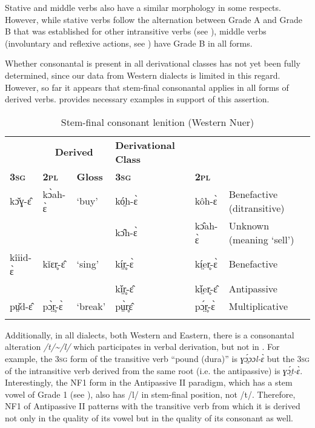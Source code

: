 \documentclass[output=paper,newtxmath,modfonts,nonflat,draftmode]{langsci/langscibook}
\begin{document}
Stative and middle verbs also have a similar morphology in some respects. However, while stative verbs follow the alternation between Grade A and Grade B that was established for other intransitive verbs (see ), middle verbs (involuntary and reflexive actions, see ) have Grade B in all forms.

Whether consonantal  is present in all derivational classes has not yet been fully determined, since our data from Western  dialects is limited in this regard. However, so far it appears that stem-final consonantal  applies in all forms of derived verbs.  provides necessary examples in support of this assertion. 



\begin{table}
\begin{tabularx}{\textwidth}{lllllX}
\lsptoprule

\multicolumn{3}{c}{\bfseries Transitive} & \multicolumn{2}{c}{\bfseries Derived} & \bfseries Derivational Class\\
\bfseries\scshape 3sg & \bfseries\scshape 2pl & \bfseries Gloss & \bfseries\scshape 3sg & \multicolumn{1}{l}{\bfseries\scshape 2pl} & \\
\midrule
kɔ̌ɣ-ɛ̂ & kɔ̀ah-ɛ̀ & ‘buy’ & kó̤h-ɛ̀ & kôh-ɛ̀ & Benefactive (ditransitive)\\
&  &  & kɔ̂h-ɛ̀ & kɔ̂ah-ɛ̀ & Unknown (meaning ‘sell’)\\

\tablevspace
kîiid-ɛ̀ & kǐɛr̥-ɛ̂ & ‘sing’ & kí̤r̥-ɛ̀ & kí̤er̥-ɛ̀ & Benefactive\\
&  &  & kǐ̤r̥-ɛ̂ & kǐ̤er̥-ɛ̂ & Antipassive\\

\tablevspace
pṳ̌d-ɛ̂ & pɔ̤̀r̥-ɛ̀ & ‘break’ & pṳ̀r̥ɛ̂ & pɔ̤́r̥-ɛ̀ & Multiplicative\\
\lspbottomrule
\end{tabularx}
\caption{Stem-final consonant lenition (Western Nuer)}
\label{tab:monich:16}
\end{table}

Additionally, in all  dialects, both Western and Eastern, there is a consonantal alteration \textit{/t/{\textasciitilde}/l/} which participates in verbal derivation, but not in . For example, the 3\textsc{sg} form of the transitive verb “pound (dura)” is \textit{ɣɔ̤́ɔɔl-ɛ̀} but the 3\textsc{sg} of the intransitive verb derived from the same root (i.e. the antipassive) is \textit{ɣɔ̤́t-ɛ̀}. Interestingly, the NF1 form in the Antipassive II paradigm, which has a stem vowel of Grade 1 (see ), also has /l/ in stem-final position, not /t/. Therefore, NF1 of Antipassive II patterns with the transitive verb from which it is derived not only in the quality of its vowel but in the quality of its consonant as well.
\end{document}
